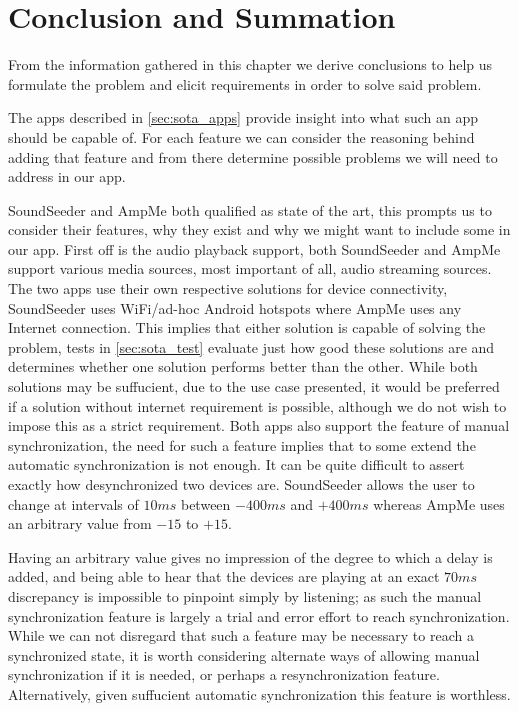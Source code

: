 \section{Conclusion and Summation}
From the information gathered in this chapter we derive conclusions to help us formulate the problem and elicit requirements in order to solve said problem.

\bigskip
The apps described in \cref{sec:sota_apps} provide insight into what such an app should be capable of.
For each feature we can consider the reasoning behind adding that feature and from there determine possible problems we will need to address in our app.

SoundSeeder and AmpMe both qualified as state of the art, this prompts us to consider their features, why they exist and why we might want to include some in our app.
First off is the audio playback support, both SoundSeeder and AmpMe support various media sources, most important of all, audio streaming sources.
The two apps use their own respective solutions for device connectivity, SoundSeeder uses WiFi/ad-hoc Android hotspots where AmpMe uses any Internet connection.
This implies that either solution is capable of solving the problem, tests in \cref{sec:sota_test} evaluate just how good these solutions are and determines whether one solution performs better than the other.
While both solutions may be suffucient, due to the use case presented, it would be preferred if a solution without internet requirement is possible, although we do not wish to impose this as a strict requirement.
Both apps also support the feature of manual synchronization, the need for such a feature implies that to some extend the automatic synchronization is not enough.
It can be quite difficult to assert exactly how desynchronized two devices are.
SoundSeeder allows the user to change at intervals of $10 ms$ between $-400 ms$ and $+400 ms$ whereas AmpMe uses an arbitrary value from $-15$ to $+15$.

Having an arbitrary value gives no impression of the degree to which a delay is added, and being able to hear that the devices are playing at an exact $70ms$ discrepancy is impossible to pinpoint simply by listening; as such the manual synchronization feature is largely a trial and error effort to reach synchronization.
While we can not disregard that such a feature may be necessary to reach a synchronized state, it is worth considering alternate ways of allowing manual synchronization if it is needed, or perhaps a resynchronization feature.
Alternatively, given suffucient automatic synchronization this feature is worthless.

